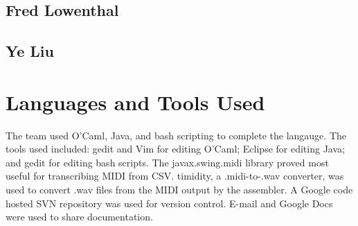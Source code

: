 \documentclass[12pt,A4]{book}
\begin{document}
\subsection{Fred Lowenthal}
\subsection{Ye Liu}
\section{Languages and Tools Used}
The team used O'Caml, Java, and bash scripting to complete the langauge. The tools used included: gedit and Vim for editing O'Caml; Eclipse for editing Java; and gedit for editing bash scripts. The javax.swing.midi library proved most useful for transcribing MIDI from CSV. timidity, a .midi-to-.wav converter, was used to convert .wav files from the MIDI output by the assembler. A Google code hosted SVN repository was used for version control. E-mail and Google Docs were used to share documentation.
\end{document}
